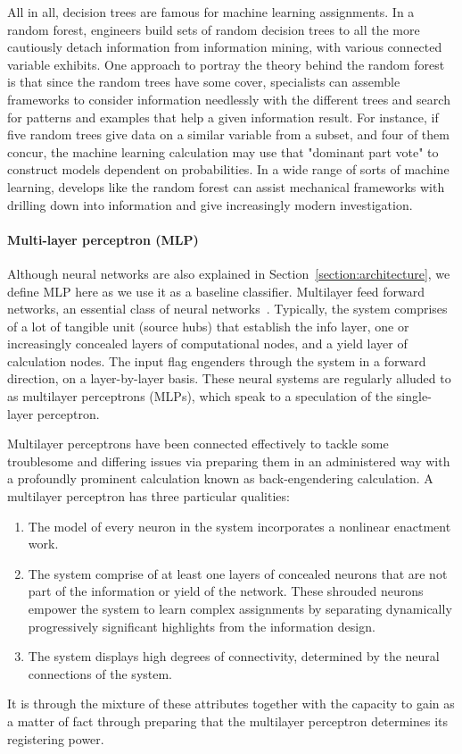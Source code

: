 All in all, decision trees are famous for machine learning assignments. In a random forest, engineers build sets of random decision trees to all the more cautiously detach information from information mining, with various connected variable exhibits. One approach to portray the theory behind the random forest is that since the random trees have some cover, specialists can assemble frameworks to consider information needlessly with the different trees and search for patterns and examples that help a given information result. For instance, if five random trees give data on a similar variable from a subset, and four of them concur, the machine learning calculation may use that "dominant part vote" to construct models dependent on probabilities. In a wide range of sorts of machine learning, develops like the random forest can assist mechanical frameworks with drilling down into information and give increasingly modern investigation.

\paragraph{Multi-layer perceptron (MLP)}
Although neural networks are also explained in Section~\ref{section:architecture}, we define MLP here as we use it as a baseline classifier. 
Multilayer feed forward networks, an essential class of neural networks~\cite{haykin1994neural}. Typically, the system comprises of a lot of tangible unit (source hubs) that establish the info layer, one or increasingly concealed layers of computational nodes, and a yield layer of calculation nodes. The input flag engenders through the system in a forward direction, on a layer-by-layer basis. These neural systems are regularly alluded to as multilayer perceptrons (MLPs), which speak to a speculation of the single-layer perceptron. 

Multilayer perceptrons have been connected effectively to tackle some troublesome and differing issues via preparing them in an administered way with a profoundly prominent calculation known as back-engendering calculation. 
A multilayer perceptron has three particular qualities: 
\begin{enumerate}
    \item The model of every neuron in the system incorporates a nonlinear enactment work. 

    \item The system comprise of at least one layers of concealed neurons that are not part of the information or yield of the network. These shrouded neurons empower the system to learn complex assignments by separating dynamically progressively significant highlights from the information design. 

    \item The system displays high degrees of connectivity, determined by the neural connections of the system. 
\end{enumerate}
It is through the mixture of these attributes together with the capacity to gain as a matter of fact through preparing that the multilayer perceptron determines its registering power.

